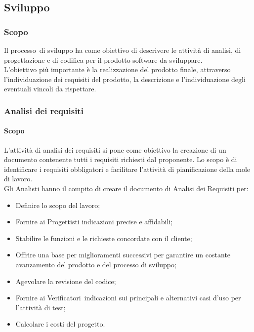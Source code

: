 \subsection{Sviluppo} 
\subsubsection{Scopo} 
Il processo\glo\ di sviluppo ha come obiettivo di descrivere le attività di analisi, di progettazione e di codifica per il prodotto software da sviluppare. \\
L'obiettivo più importante è la realizzazione del prodotto finale, attraverso l'individuazione dei requisiti del prodotto, 
la descrizione e l'individuazione degli eventuali vincoli da rispettare.


\subsubsection{Analisi dei requisiti} 
\paragraph{Scopo} 
L'attività di analisi dei requisiti si pone come obiettivo la creazione di un documento contenente tutti i requisiti richiesti dal proponente.
Lo scopo è di identificare i requisiti obbligatori e facilitare l'attività di pianificazione della mole di lavoro.\\
Gli Analisti hanno il compito di creare il documento di Analisi dei Requisiti per:
\begin{itemize}
    \item Definire lo scopo del lavoro;
    \item Fornire ai Progettisti indicazioni precise e affidabili;
    \item Stabilire le funzioni e le richieste concordate con il cliente;
    \item Offrire una base per miglioramenti successivi per garantire un costante avanzamento del prodotto e del processo di sviluppo;
    \item Agevolare la revisione del codice;
    \item Fornire ai Verificatori\glo\ indicazioni sui principali e alternativi casi d'uso per l'attività di test;
    \item Calcolare i costi del progetto.
\end{itemize}   

